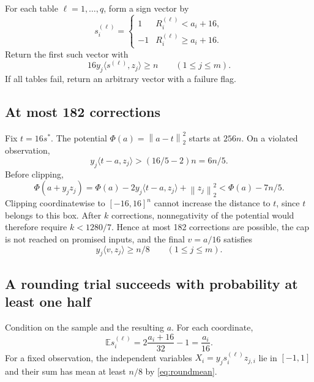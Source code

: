 \documentclass[11pt,a4paper]{article}
\theoremstyle{remark}
\newcommand{\norm}[1]{\left\lVert#1\right\rVert}
\newcommand{\ip}[2]{\langle #1,#2\rangle}
\newcommand{\1}{\mathbf 1}
\begin{document}
For each table $\ell=1,\ldots,q$, form a sign vector by
\begin{equation}\label{eq:round}
 s_i^{(\ell)}
 =\begin{cases}
 1 & R_i^{(\ell)}<a_i+16,\\
 -1 & R_i^{(\ell)}\ge a_i+16.
 \end{cases}
\end{equation}
Return the first such vector with
\begin{equation}\label{eq:roundaccept}
 16y_j\ip{s^{(\ell)}}{z_j}\ge n
 \qquad(1\le j\le m).
\end{equation}
If all tables fail, return an arbitrary vector with a failure flag.

\subsection{At most 182 corrections}

Fix $t=16s^*$. The potential $\Phi(a)=\norm{a-t}_2^2$ starts at $256n$.
On a violated observation,
\[
 y_j\ip{t-a}{z_j}>
 (16/5-2)n=6n/5.
\]
Before clipping,
\[
 \Phi(a+y_jz_j)
 =\Phi(a)-2y_j\ip{t-a}{z_j}+\norm{z_j}_2^2
 <\Phi(a)-7n/5.
\]
Clipping coordinatewise to $[-16,16]^n$ cannot increase the distance to $t$,
since $t$ belongs to this box. After $k$ corrections, nonnegativity of the
potential would therefore require $k<1280/7$. Hence at most 182 corrections
are possible, the cap is not reached on promised inputs, and the final
$v=a/16$ satisfies
\begin{equation}\label{eq:roundmean}
 y_j\ip{v}{z_j}\ge n/8
 \qquad(1\le j\le m).
\end{equation}

\subsection{A rounding trial succeeds with probability at least one half}

Condition on the sample and the resulting $a$. For each coordinate,
\[
 \mathbb E s_i^{(\ell)}
 =2\frac{a_i+16}{32}-1=\frac{a_i}{16}.
\]
For a fixed observation, the independent variables
$X_i=y_js_i^{(\ell)}z_{j,i}$ lie in $[-1,1]$ and their sum has mean at least
$n/8$ by \eqref{eq:roundmean}.
\end{document}
